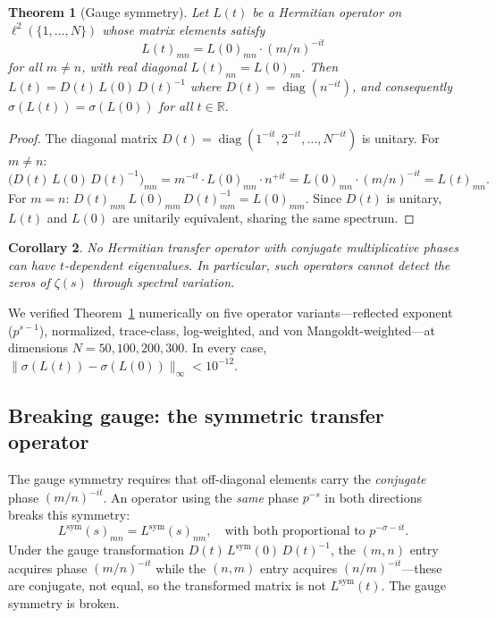 \documentclass[11pt,a4paper]{article}
\newtheorem{theorem}{Theorem}
\newtheorem{corollary}[theorem]{Corollary}
\DeclareMathOperator{\diag}{diag}
\begin{document}
\begin{theorem}[Gauge symmetry]\label{thm:gauge}
Let $L(t)$ be a Hermitian operator on $\ell^2(\{1,\ldots,N\})$ whose matrix elements satisfy
\[
L(t)_{mn} = L(0)_{mn} \cdot (m/n)^{-it}
\]
for all $m \neq n$, with real diagonal $L(t)_{nn} = L(0)_{nn}$.
Then $L(t) = D(t)\,L(0)\,D(t)^{-1}$ where $D(t) = \diag(n^{-it})$, and consequently $\sigma(L(t)) = \sigma(L(0))$ for all $t \in \mathbb{R}$.
\end{theorem}

\begin{proof}
The diagonal matrix $D(t) = \diag(1^{-it}, 2^{-it}, \ldots, N^{-it})$ is unitary.
For $m \neq n$:
\[
\bigl(D(t)\,L(0)\,D(t)^{-1}\bigr)_{mn} = m^{-it} \cdot L(0)_{mn} \cdot n^{+it} = L(0)_{mn} \cdot (m/n)^{-it} = L(t)_{mn}.
\]
For $m = n$: $D(t)_{mm}\,L(0)_{mm}\,D(t)^{-1}_{mm} = L(0)_{mm}$.
Since $D(t)$ is unitary, $L(t)$ and $L(0)$ are unitarily equivalent, sharing the same spectrum.
\end{proof}

\begin{corollary}
No Hermitian transfer operator with conjugate multiplicative phases can have $t$-dependent eigenvalues.
In particular, such operators cannot detect the zeros of $\zeta(s)$ through spectral variation.
\end{corollary}

We verified Theorem~\ref{thm:gauge} numerically on five operator variants---reflected exponent ($p^{s-1}$), normalized, trace-class, log-weighted, and von Mangoldt-weighted---at dimensions $N = 50, 100, 200, 300$.
In every case, $\|\sigma(L(t)) - \sigma(L(0))\|_\infty < 10^{-12}$.

\subsection{Breaking gauge: the symmetric transfer operator}

The gauge symmetry requires that off-diagonal elements carry the \emph{conjugate} phase $(m/n)^{-it}$.
An operator using the \emph{same} phase $p^{-s}$ in both directions breaks this symmetry:
\[
L^{\mathrm{sym}}(s)_{mn} = L^{\mathrm{sym}}(s)_{nm}, \quad \text{with both proportional to } p^{-\sigma - it}.
\]
Under the gauge transformation $D(t)\,L^{\mathrm{sym}}(0)\,D(t)^{-1}$, the $(m,n)$ entry acquires phase $(m/n)^{-it}$ while the $(n,m)$ entry acquires $(n/m)^{-it}$---these are conjugate, not equal, so the transformed matrix is not $L^{\mathrm{sym}}(t)$.
The gauge symmetry is broken.
\end{document}
